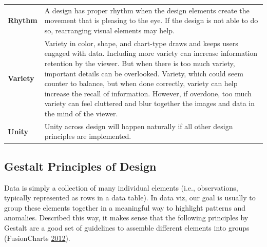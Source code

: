 \documentclass[]{book}
\begin{document}
\begin{longtable}[]{@{}ll@{}}
\begin{minipage}[t]{0.15\columnwidth}
\textbf{Rhythm}\strut
\end{minipage} & \begin{minipage}[t]{0.79\columnwidth}\raggedright
A design has proper rhythm when the design elements create the movement that is pleasing to the eye. If the design is not able to do so, rearranging visual elements may help.\strut
\end{minipage}\tabularnewline
\begin{minipage}[t]{0.15\columnwidth}\raggedright
\textbf{Variety}\strut
\end{minipage} & \begin{minipage}[t]{0.79\columnwidth}\raggedright
Variety in color, shape, and chart-type draws and keeps users engaged with data. Including more variety can increase information retention by the viewer. But when there is too much variety, important details can be overlooked. Variety, which could seem counter to balance, but when done correctly, variety can help increase the recall of information. However, if overdone, too much variety can feel cluttered and blur together the images and data in the mind of the viewer.\strut
\end{minipage}\tabularnewline
\begin{minipage}[t]{0.15\columnwidth}\raggedright
\textbf{Unity}\strut
\end{minipage} & \begin{minipage}[t]{0.79\columnwidth}\raggedright
Unity across design will happen naturally if all other design principles are implemented.\strut
\end{minipage}\tabularnewline
\bottomrule
\end{longtable}

\hypertarget{gestalt-principles-of-design}{%
\subsection{Gestalt Principles of Design}\label{gestalt-principles-of-design}}

Data is simply a collection of many individual elements (i.e., observations, typically represented as rows in a data table). In data viz, our goal is usually to group these elements together in a meaningful way to highlight patterns and anomalies. Described this way, it makes sense that the following principles by Gestalt are a good set of guidelines to assemble different elements into groups (FusionCharts \protect\hyperlink{ref-principles-fusioncharts}{2012}).
\end{document}
